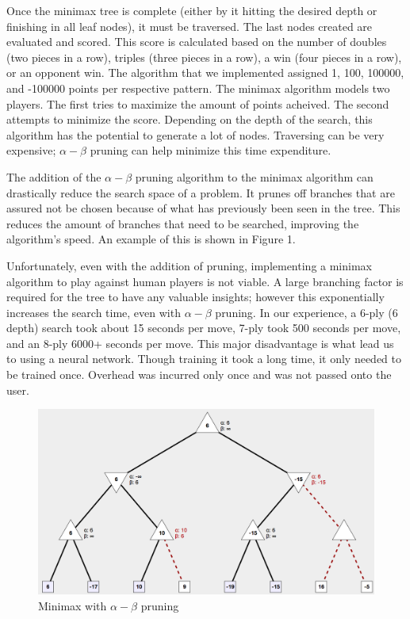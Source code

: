 \documentclass[12pt]{article}
\begin{document}
Once the minimax tree is complete (either by it hitting the desired depth or finishing in all leaf nodes), it must be traversed. The last nodes created are evaluated and scored. This score is calculated based on the number of doubles (two pieces in a row), triples (three pieces in a row), a win (four pieces in a row), or an opponent win. The algorithm that we implemented assigned 1, 100, 100000, and -100000 points per respective pattern. The minimax algorithm models two players. The first tries to maximize the amount of points acheived. The second attempts to minimize the score. Depending on the depth of the search, this algorithm has the potential to generate a lot of nodes. Traversing can be very expensive; $\alpha - \beta$ pruning can help minimize this time expenditure.

The addition of the $\alpha - \beta$ pruning algorithm to the minimax algorithm can drastically reduce the search space of a problem. It prunes off branches that are assured not be chosen because of what has previously been seen in the tree. This reduces the amount of branches that need to be searched, improving the algorithm's speed. An example of this is shown in Figure 1.

Unfortunately, even with the addition of pruning, implementing a minimax algorithm to play against human players is not viable. A large branching factor is required for the tree to have any valuable insights; however this exponentially increases the search time, even with $\alpha - \beta$ pruning. In our experience, a 6-ply (6 depth) search took about 15 seconds per move, 7-ply took 500 seconds per move, and an 8-ply 6000+ seconds per move. This major disadvantage is what lead us to using a neural network. Though training it took a long time, it only needed to be trained once. Overhead was incurred only once and was not passed onto the user.


\begin{figure}[H]
\centering
\includegraphics[scale=0.35]{img/alpha-beta.png}
\caption{Minimax with $\alpha - \beta$ pruning}
\end{figure}
\end{document}
